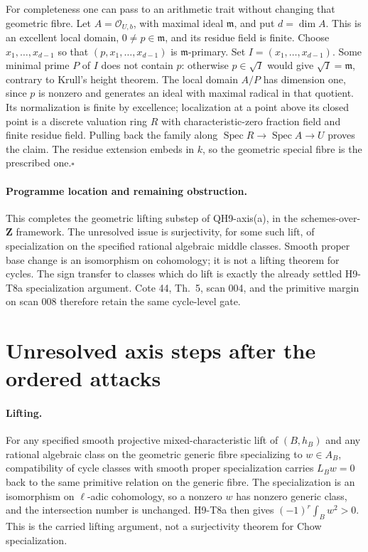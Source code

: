 For completeness one can pass to an arithmetic trait without
changing that geometric fibre. Let $A=\mathcal O_{U,b}$, with
maximal ideal $\mathfrak m$, and put $d=\dim A$. This is an
excellent local domain, $0\ne p\in\mathfrak m$, and its residue
field is finite. Choose $x_1,\ldots,x_{d-1}$ so that
$(p,x_1,\ldots,x_{d-1})$ is $\mathfrak m$-primary. Set
$I=(x_1,\ldots,x_{d-1})$. Some minimal prime $P$ of $I$ does
not contain $p$: otherwise $p\in\sqrt I$ would give
$\sqrt I=\mathfrak m$, contrary to Krull's height theorem.
The local domain $A/P$ has dimension one, since $p$ is nonzero
and generates an ideal with maximal radical in that quotient.
Its normalization is finite by excellence; localization at a
point above its closed point is a discrete valuation ring $R$
with characteristic-zero fraction field and finite residue field.
Pulling back the family along
$\operatorname{Spec}R\to\operatorname{Spec}A\to U$ proves the
claim. The residue extension embeds in $k$, so the geometric
special fibre is the prescribed one.\hfill$\square$

\paragraph{Programme location and remaining obstruction.}
This completes the geometric lifting substep of QH9-axis(a),
in the schemes-over-$\mathbf Z$ framework. The unresolved issue
is surjectivity, for some such lift, of specialization on the
specified rational algebraic middle classes. Smooth proper base
change is an isomorphism on cohomology; it is not a lifting
theorem for cycles. The sign transfer to classes which do lift
is exactly the already settled H9-T8a specialization argument.
Cote 44, Th.~5, scan 004, and the primitive margin on scan 008
therefore retain the same cycle-level gate.

\section{Unresolved axis steps after the ordered attacks}

\paragraph{Lifting.}
For any specified smooth projective mixed-characteristic lift
of $(B,h_B)$ and any rational algebraic class on the geometric
generic fibre specializing to $w\in A_B$, compatibility of
cycle classes with smooth proper specialization carries
$L_Bw=0$ back to the same primitive relation on the generic
fibre. The specialization is an isomorphism on $\ell$-adic
cohomology, so a nonzero $w$ has nonzero generic class, and the
intersection number is unchanged. H9-T8a then gives
$(-1)^r\int_Bw^2>0$. This is the carried lifting argument,
not a surjectivity theorem for Chow specialization.

